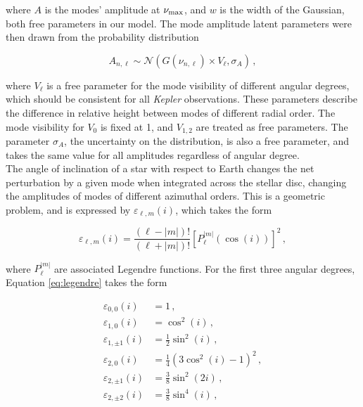 \documentclass[12pt]{article}
\newcommand{\numax}{\mbox{$\nu_{\rm max}$}\xspace}
\newcommand{\kepler}{\emph{Kepler}\xspace}
\begin{document}
\noindent where $A$ is the modes' amplitude at \numax, and $w$ is the width of the Gaussian, both free parameters in our model. 
The mode amplitude latent parameters were then drawn from the probability distribution

\begin{equation}\label{eq:amplitwod}
	A_{n, \ell} \sim \mathcal{N}(G(\nu_{n,\ell}) \times V_\ell, \sigma_{A})\, ,
\end{equation}

\noindent where $V_\ell$ is a free parameter for the mode visibility of different angular degrees, which should be consistent for all \kepler observations. These parameters describe the difference in relative height between modes of different radial order. The mode visibility for $V_0$ is fixed at 1, and $V_{1,2}$ are treated as free parameters. The parameter $\sigma_{A}$, the uncertainty on the distribution, is also a free parameter, and takes the same value for all amplitudes regardless of angular degree.\\

The angle of inclination of a star with respect to Earth changes the net perturbation by a given mode when integrated across the stellar disc, changing the amplitudes of modes of different azimuthal orders. This is a geometric problem, and is expressed by $\varepsilon_{\ell, m}(i)$, which takes the form \cite{gizon+solanki2003}

\begin{equation}\label{eq:legendre}
	\varepsilon_{\ell, m}(i) = \frac{(\ell - |m|)!}{(\ell + |m|)!}\left[P_\ell^{|m|}(\cos(i))\right]^2\, ,
\end{equation}

\noindent where $P_\ell^{|m|}$ are associated Legendre functions. For the first three angular degrees, Equation \ref{eq:legendre} takes the form \cite{handberg+campante2011}

\begin{equation}
	\begin{split}
		\varepsilon_{0,0}(i) &= 1\, ,\\
		\varepsilon_{1,0}(i) &= \cos^2(i)\, ,    \\
		\varepsilon_{1,\pm1}(i) &= \frac{1}{2}\sin^2(i)\, ,\\
		\varepsilon_{2,0}(i) &= \frac{1}{4}(3\cos^2(i) - 1)^2\, ,\\
		\varepsilon_{2,\pm1}(i) &= \frac{3}{8}\sin^2(2i)\, ,\\
		\varepsilon_{2,\pm2}(i) &= \frac{3}{8}\sin^4(i)\, ,
	\end{split}
\end{equation}
\end{document}
